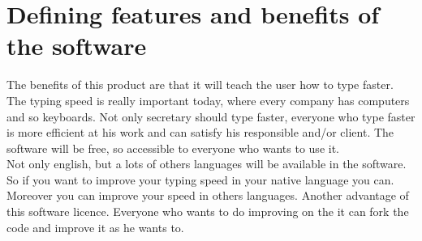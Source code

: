 \chapter{Defining features and benefits of the software}
The benefits of this product are that it will teach the user how to type faster. The typing speed is really important today, where every company has computers and so keyboards. Not only secretary should type faster, everyone who type faster is more efficient at his work and can satisfy his responsible and/or client. The software will be free, so accessible to everyone who wants to use it. \\
Not only english, but a lots of others languages will be available in the software. So if you want to improve your typing speed in your native language you can. Moreover you can improve your speed in others languages.
Another advantage of this software licence. Everyone who wants to do improving on the it can fork the code and improve it as he wants to.
